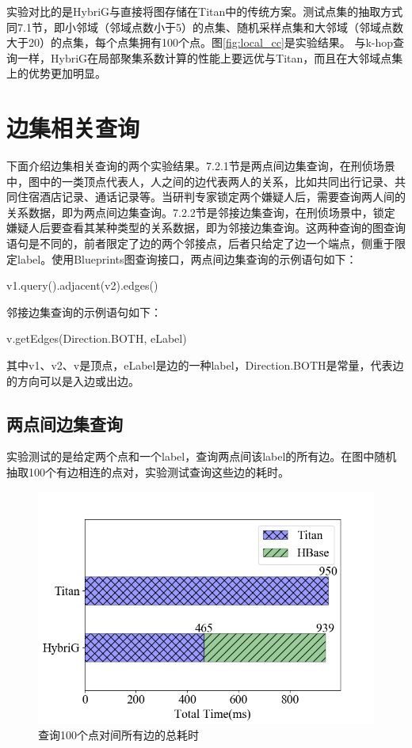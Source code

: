 实验对比的是HybriG与直接将图存储在Titan中的传统方案。测试点集的抽取方式同7.1节，即小邻域（邻域点数小于5）的点集、随机采样点集和大邻域（邻域点数大于20）的点集，每个点集拥有100个点。图\ref{fig:local_cc}是实验结果。
与k-hop查询一样，HybriG在局部聚集系数计算的性能上要远优与Titan，而且在大邻域点集上的优势更加明显。

\section{边集相关查询}
下面介绍边集相关查询的两个实验结果。7.2.1节是两点间边集查询，在刑侦场景中，图中的一类顶点代表人，人之间的边代表两人的关系，比如共同出行记录、共同住宿酒店记录、通话记录等。当研判专家锁定两个嫌疑人后，需要查询两人间的关系数据，即为两点间边集查询。7.2.2节是邻接边集查询，在刑侦场景中，锁定嫌疑人后要查看其某种类型的关系数据，即为邻接边集查询。这两种查询的图查询语句是不同的，前者限定了边的两个邻接点，后者只给定了边一个端点，侧重于限定label。使用Blueprints图查询接口，两点间边集查询的示例语句如下：
\begin{center}
  v1.query().adjacent(v2).edges()
\end{center}
邻接边集查询的示例语句如下：
\begin{center}
  v.getEdges(Direction.BOTH, eLabel)
\end{center}
其中v1、v2、v是顶点，eLabel是边的一种label，Direction.BOTH是常量，代表边的方向可以是入边或出边。
\subsection{两点间边集查询}
实验测试的是给定两个点和一个label，查询两点间该label的所有边。在图中随机抽取100个有边相连的点对，实验测试查询这些边的耗时。

\begin{figure}[htbp]
\centering
\includegraphics[width=120mm]{fig/edge_query_perf.png}
\caption{查询100个点对间所有边的总耗时}
\label{fig:edge_query_perf}
\end{figure}

